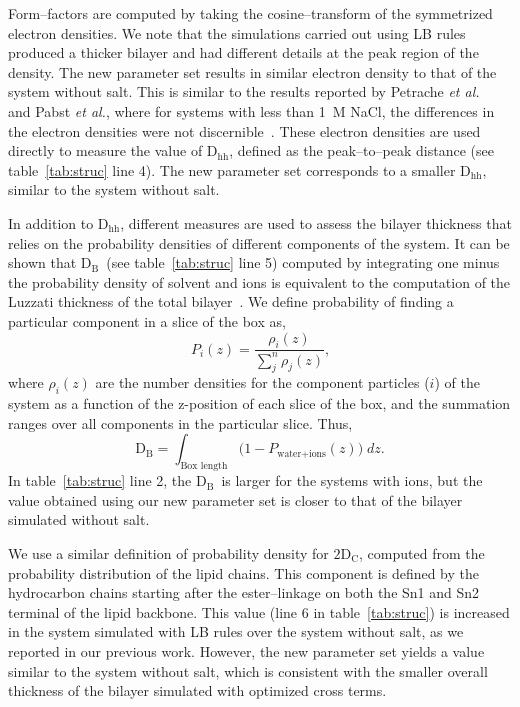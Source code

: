 \documentclass[12pt,openany,final]{book}
\newcommand{\etal}{\textit{et al.}}
\newcommand{\db}{$\text{D}_\text{B}$}
\newcommand{\dhh}{$\text{D}_\text{hh}$}
\newcommand{\dc}{$\text{2D}_\text{C}$}
\begin{document}
Form--factors are computed by taking the cosine--transform of the symmetrized electron densities.   
We note that the simulations carried out using LB rules produced a
thicker bilayer and had different details at the peak region of the density. 
The new parameter set results in similar electron density to that of the system without salt.
This is similar to the results reported by Petrache
\etal~ and Pabst \etal, where for systems with less than 1~M NaCl, 
the differences in the electron densities were not
discernible~\cite{petrache:2006:swelling,pabst:2007}. 
These electron densities are used directly to measure the value of \dhh, 
defined as the peak--to--peak distance (see table~\ref{tab:struc} line 4). 
The new parameter set corresponds to a smaller \dhh, similar to the system without salt.

In addition to \dhh, different measures are used to assess the bilayer thickness 
that relies on the probability densities of different components of the system.
It can be shown that \db~(see table~\ref{tab:struc} line 5) computed by integrating one minus
the probability density of solvent and ions is equivalent to the computation of the 
Luzzati thickness of the total bilayer~\cite{fogarty:2015,chiu:2009}.
We define probability of finding a particular component in a slice of the box as,
\begin{equation}
    \label{eq:probability}
    P_{i}(z) = \frac{\rho_i(z)}{\sum^n_{j}\rho_{j}(z)}\text{,}
\end{equation}
where $\rho_{i}(z)$ are the number densities for the 
component particles ($i$) of the system as a function of the 
z-position of each slice of the box, and the summation
ranges over all components in the particular slice.
Thus, 
\begin{equation}
\text{\db}=\int_{\text{Box length}}\big(1-P_{\text{water}+\text{ions}}(z)\big)\;dz\text{.}
\end{equation}
In table~\ref{tab:struc} line 2, the \db~is larger for the systems
with ions, but the value obtained using our new parameter set is closer to that of
the bilayer simulated without salt.

We use a similar definition of probability density for \dc, 
computed from the probability distribution of the lipid chains. 
This component is defined by the hydrocarbon chains starting after the ester--linkage
on both the Sn1 and Sn2 terminal of the lipid backbone. 
This value (line 6 in table~\ref{tab:struc}) is increased in the system simulated
with LB rules over the system without salt, 
as we reported in our previous work. 
However, the new parameter set yields a value similar to the system without salt, 
which is consistent with the smaller overall thickness of the bilayer 
simulated with optimized cross terms.
\end{document}
